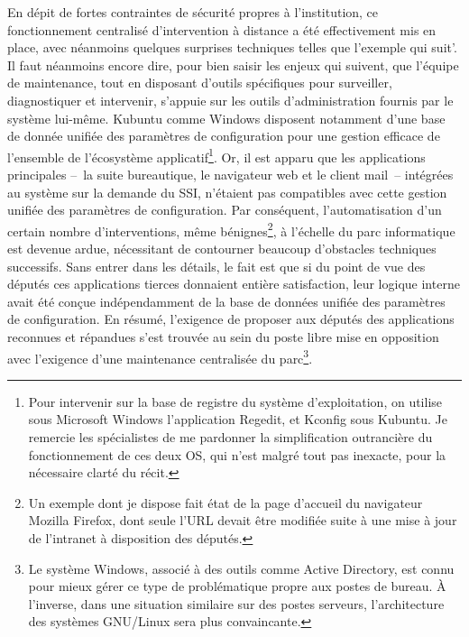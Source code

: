 \documentclass{FramateX}
\begin{document}
\begin{refsection}
En dépit de fortes contraintes de sécurité propres à
l'institution, ce fonctionnement centralisé d'intervention à distance a
été effectivement mis en place, avec néanmoins quelques surprises
techniques telles que l'exemple qui suit'. Il faut néanmoins encore
dire, pour bien saisir les enjeux qui suivent, que l'équipe de
maintenance, tout en disposant d'outils spécifiques pour surveiller,
diagnostiquer et intervenir, s'appuie sur les outils d'administration
fournis par le système lui-même. Kubuntu comme Windows disposent
notamment d'une base de donnée unifiée des paramètres de configuration
pour une gestion efficace de l'ensemble de l'écosystème
applicatif\footnote{Pour intervenir sur la base de registre du système
d'exploitation, on utilise sous Microsoft Windows l'application
Regedit, et Kconfig sous Kubuntu. Je remercie les spécialistes de me
pardonner la simplification outrancière du fonctionnement de ces deux
OS, qui n'est malgré tout pas inexacte, pour la nécessaire clarté du
récit.}. Or, il est apparu que les applications principales
–~la suite bureautique, le navigateur web et le
client mail~– intégrées au système sur la demande du
SSI, n'étaient pas compatibles avec cette gestion unifiée des
paramètres de configuration. Par conséquent, l'automatisation d'un
certain nombre d'interventions, même bénignes\footnote{Un exemple dont
je dispose fait état de la page d'accueil du navigateur Mozilla
Firefox, dont seule l'URL devait être modifiée suite à une mise à jour
de l'intranet à disposition des députés.}, à l'échelle du parc
informatique est devenue ardue, nécessitant de contourner beaucoup
d'obstacles techniques successifs. Sans entrer dans les détails, le
fait est que si du point de vue des députés ces applications tierces
donnaient entière satisfaction, leur logique interne avait été conçue
indépendamment de la base de données unifiée des paramètres de
configuration. En résumé, l'exigence de proposer aux députés des
applications reconnues et répandues s'est trouvée au sein du poste
libre mise en opposition avec l'exigence d'une maintenance centralisée
du parc\footnote{Le système Windows, associé à des outils comme Active
Directory, est connu pour mieux gérer ce type de problématique propre
aux postes de bureau. À l'inverse, dans une situation similaire sur des
postes serveurs, l'architecture des systèmes GNU/Linux sera plus
convaincante.}.



\end{refsection}
\end{document}
